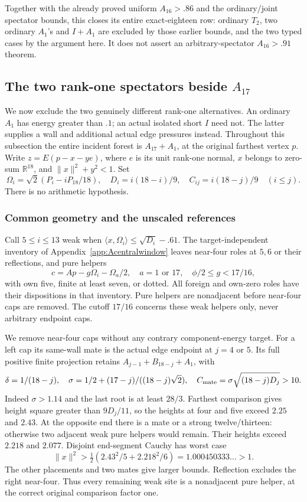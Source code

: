 \documentclass[11pt]{article}
\theoremstyle{definition}
\theoremstyle{remark}
\newcommand{\ip}[2]{\langle #1,#2\rangle}
\newcommand{\norm}[1]{\lVert #1\rVert}
\begin{document}
Together with the already proved uniform \(A_{16}>.86\) and the
ordinary/joint spectator bounds, this closes its entire exact-eighteen
row: ordinary \(T_2\), two ordinary \(A_1\)'s and \(I+A_1\)
are excluded by those earlier bounds, and the two typed cases by the
argument here.  It does not assert an arbitrary-spectator
\(A_{16}>.91\) theorem.

\subsection{The two rank-one spectators beside \(A_{17}\)}
\label{app:A17rankone18}
We now exclude the two genuinely different rank-one alternatives.
An ordinary \(A_1\) has energy greater than \(.1\); an actual isolated
short \(I\) need not. The latter supplies a wall and additional actual
edge pressures instead. Throughout this subsection the entire incident
forest is \(A_{17}+A_1\), at the original farthest vertex \(p\).
Write \(z=E(p-x-ye)\), where \(e\) is its unit rank-one normal,
\(x\) belongs to zero-sum \(\mathbb R^{18}\), and
\(\norm x^2+y^2<1\). Set
\[
 \Omega_i=\sqrt2(P_i-iP_{18}/18),\quad
 D_i=i(18-i)/9,\quad C_{ij}=i(18-j)/9\quad(i\le j).
\]
There is no arithmetic hypothesis.

\subsubsection{Common geometry and the unscaled references}
Call \(5\le i\le13\) weak when
\(\ip x{\Omega_i}\le\sqrt{D_i}-.61\).
The target-independent inventory of Appendix~\ref{app:Acentralwindow}
leaves near-four roles at \(5,6\) or their reflections, and pure helpers
\[
 c=Ap-g\Omega_i-\Omega_a/2,\quad a=1\text{ or }17,
 \quad\phi/2\le g<17/16,
\]
with own five, finite at least seven, or dotted. All foreign and own-zero
roles have their dispositions in that inventory. Pure helpers are
nonadjacent before near-four caps are removed. The cutoff \(17/16\)
concerns these weak helpers only, never arbitrary endpoint caps.

We remove near-four caps without any contrary component-energy target.
For a left cap its same-wall mate is the actual edge endpoint at
\(j=4\) or \(5\). Its full positive finite projection retains
\(A_{j-1}+B_{18-j}+A_1\), with
\[
 \delta=1/(18-j),\quad
 \sigma=1/2+(17-j)/((18-j)\sqrt2),\quad
 C_{\rm mate}=\sigma\sqrt{(18-j)D_j}>10.
\]
Indeed \(\sigma>1.14\) and the last root is at least \(28/3\).
Farthest comparison gives height square greater than \(9D_j/11\),
so the heights at four and five exceed \(2.25\) and \(2.43\).
At the opposite end there is a mate or a strong twelve/thirteen:
otherwise two adjacent weak pure helpers would remain. Their heights
exceed \(2.218\) and \(2.077\). Disjoint end-segment Cauchy has
worst case
\[
 \norm x^2>\tfrac12(2.43^2/5+2.218^2/6)
                  =1.000450333\ldots>1.
\]
The other placements and two mates give larger bounds. Reflection
excludes the right near-four. Thus every remaining weak site is a
nonadjacent pure helper, at the correct original comparison factor one.
\end{document}
